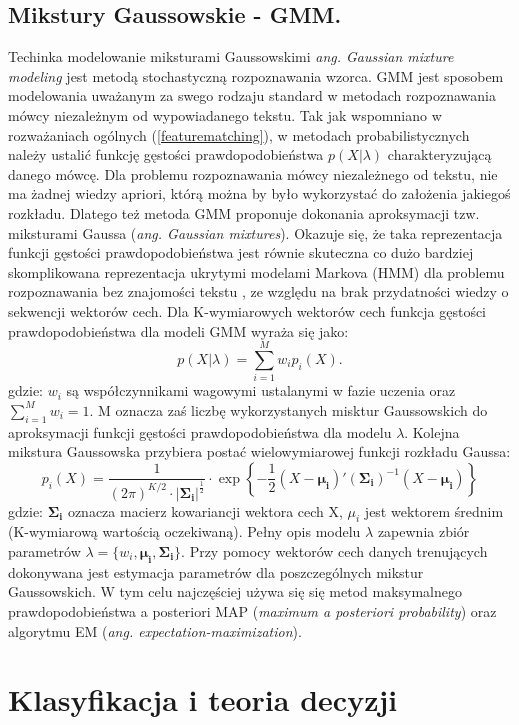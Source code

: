 \subsection{Mikstury Gaussowskie - GMM.}
Techinka modelowanie miksturami Gaussowskimi {\textit{ang. Gaussian mixture modeling}} jest metodą stochastyczną rozpoznawania wzorca. GMM jest sposobem modelowania uważanym za swego rodzaju standard w metodach rozpoznawania mówcy niezależnym od wypowiadanego tekstu. Tak jak wspomniano w rozważaniach ogólnych (\ref{featurematching}), w metodach probabilistycznych należy ustalić funkcję gęstości prawdopodobieństwa $p(X|\lambda)$ charakteryzującą danego mówcę. Dla problemu rozpoznawania mówcy niezależnego od tekstu, nie ma żadnej wiedzy apriori, którą można by było wykorzystać do założenia jakiegoś rozkładu. Dlatego też metoda GMM proponuje dokonania aproksymacji tzw. miksturami Gaussa (\textit{ang. Gaussian mixtures}). Okazuje się, że taka reprezentacja funkcji gęstości prawdopodobieństwa jest równie skuteczna co dużo bardziej skomplikowana reprezentacja ukrytymi modelami Markova (HMM) dla problemu rozpoznawania bez znajomości tekstu \cite{reynolds}, ze względu na brak przydatności wiedzy o sekwencji wektorów cech. Dla K-wymiarowych wektorów cech funkcja gęstości prawdopodobieństwa dla modeli GMM wyraża się jako:
\begin{equation}
  p(X|\lambda) = \sum^{M}_{i=1} w_ip_i(X).
\end{equation}
gdzie: $w_i$ są współczynnikami wagowymi ustalanymi w fazie uczenia oraz $\sum_{i=1}^{M} w_i =1$. M oznacza zaś liczbę wykorzystanych misktur Gaussowskich do aproksymacji funkcji gęstości prawdopodobieństwa dla modelu $ \lambda$. Kolejna mikstura Gaussowska przybiera postać wielowymiarowej funkcji rozkładu Gaussa:
\begin{equation}
  p_i(X)=\frac{1}{(2\pi)^{K/2} \cdot |\bm{\Sigma_i}|^{\frac{1}{2}}} \cdot \exp\left\{-\frac{1}{2}(X- \bm{\mu_i})'(\bm{\Sigma_i})^{-1}(X-\bm{\mu_i})\right\}
\end{equation}
gdzie: $\bm{\Sigma_i}$ oznacza macierz kowariancji wektora cech X, $\mu_i$ jest wektorem średnim (K-wymiarową wartością oczekiwaną). Pełny opis modelu $\lambda$ zapewnia zbiór parametrów $\lambda = \{w_i,\bm{\mu_i},\bm{\Sigma_i} \}$. Przy pomocy wektorów cech danych trenujących dokonywana jest estymacja parametrów dla poszczególnych mikstur Gaussowskich. W tym celu najczęściej używa się się metod maksymalnego prawdopodobieństwa a posteriori MAP (\textit{maximum a posteriori probability}) oraz algorytmu EM (\textit{ang. expectation-maximization}).
\section{Klasyfikacja i teoria decyzji}


